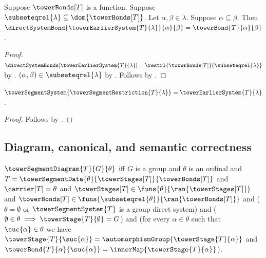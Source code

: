 \begin{proposition}\label{tower_earlier_system_bond}
    Suppose $\towerBonds[T]$ is a function.
    Suppose $\subseteqrel{\lambda}\subseteq
        \dom{\towerBonds[T]}$.
    Let $\alpha,\beta\in\lambda$.
    Suppose $\alpha\subseteq\beta$.
    Then $\directSystemBond{\towerEarlierSystem{T}{\lambda}}
        {\alpha}{\beta}=\towerBond{T}{\alpha}{\beta}$.
\end{proposition}
\begin{proof}
    $\directSystemBonds[\towerEarlierSystem{T}{\lambda}]
        =\restrl{\towerBonds[T]}{\subseteqrel{\lambda}}$ by
        .
    $(\alpha,\beta)\in\subseteqrel{\lambda}$ by
        .
    Follows by
        .
\end{proof}

\begin{proposition}\label{tower_segment_restriction_system}
    $\towerSegmentSystem{\towerSegmentRestriction{T}{\lambda}}=
        \towerEarlierSystem{T}{\lambda}$.
\end{proposition}
\begin{proof}
    Follows by
        .
\end{proof}

\subsection{Diagram, canonical, and semantic correctness}

\begin{definition}\label{tower_segment_diagram}
    $\towerSegmentDiagram{T}{G}{\theta}$ iff
        $G$ is a group and $\theta$ is an ordinal and
        $T=\towerSegmentData{\theta}{\towerStages[T]}{\towerBonds[T]}$ and
        $\carrier[T]=\theta$ and
        $\towerStages[T]\in
            \funs{\theta}{\ran{\towerStages[T]}}$ and
        $\towerBonds[T]\in
            \funs{\subseteqrel{\theta}}{\ran{\towerBonds[T]}}$ and
        ($\theta=\emptyset$ or
            $\towerSegmentSystem{T}$ is a group direct system) and
        ($\emptyset\in\theta\implies
            \towerStage{T}{\emptyset}=G$) and
        (for every $\alpha\in\theta$ such that
            $\suc{\alpha}\in\theta$ we have
            $\towerStage{T}{\suc{\alpha}}=
                \automorphismGroup{\towerStage{T}{\alpha}}$ and
            $\towerBond{T}{\alpha}{\suc{\alpha}}=
                \innerMap{\towerStage{T}{\alpha}}$).
\end{definition}

